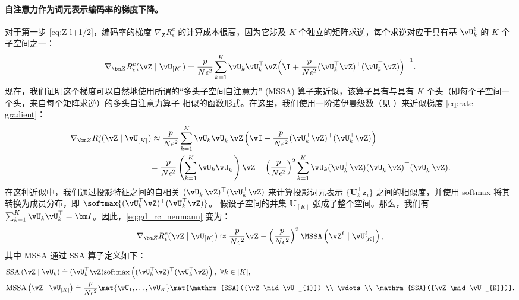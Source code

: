 \documentclass[../../book-main_zh.tex]{subfiles}
\begin{document}
\paragraph{自注意力作为词元表示编码率的梯度下降。} 对于第一步 \eqref{eq:Z l+1/2}，编码率的梯度 \(\nabla_{\bm Z} R^c_\epsilon\) 的计算成本很高，因为它涉及 \(K\) 个独立的矩阵求逆，每个求逆对应于具有基 \(\vU_{k}^{\ell}\) 的 \(K\) 个子空间之一：
\begin{equation}
    \nabla_{\bm Z} R_{\epsilon}^c(\vZ \mid \vU_{[K]})
    = \frac{p}{N\epsilon^2}\sum_{k=1}^K \vU_k\vU_k^\top\vZ\Big(\I +
    \frac{p}{N\epsilon^2}(\vU_k^\top\vZ)^\top(\vU_k^\top\vZ)\Big)^{-1}.
    \label{eq:rate-gradient}
\end{equation}
现在，我们证明这个梯度可以自然地使用所谓的“多头子空间自注意力” (MSSA) 算子来近似，该算子具有与具有 \(K\) 个头（即每个子空间一个头，来自每个矩阵求逆）的多头自注意力算子 \citep{vaswani2017attention} 相似的函数形式。在这里，我们使用一阶诺伊曼级数（见 ）来近似梯度 \eqref{eq:rate-gradient}：
\begin{align}\label{eq:gd_rc_neumann}
    \nabla_{\bm Z} R_{\epsilon}^{c}(\vZ \mid \vU_{[K]})
    &\approx \frac{p}{N\epsilon^2} \sum_{k =
    1}^{K}\vU_{k}\vU_{k}^\top\vZ\left(\vI - \frac{p}{N\epsilon^2}
    (\vU_{k}^\top\vZ)^\top(\vU_{k}^\top\vZ)\right) \notag \\
    &{= \frac{p}{N\epsilon^2} \left(\sum_{k = 1}^{K}
        \vU_{k}\vU_{k}^\top\right)\vZ -  \left(
        \frac{p}{N\epsilon^2}\right)^2\sum_{k = 1}^{K}
    \vU_{k}(\vU_{k}^\top\vZ)(\vU_{k}^\top\vZ)^\top(\vU_{k}^\top\vZ)}.
\end{align}
在这种近似中，我们通过投影特征之间的自相关 $(\vU_{k}^\top\vZ)^\top(\vU_{k}^\top\vZ)$ 来计算投影词元表示 $\{\bm U_k^\top\bm z_i\}$ 之间的相似度，并使用 softmax 将其转换为成员分布，即 $\softmax{(\vU_{k}^\top\vZ)^\top(\vU_{k}^\top\vZ)}$。
假设子空间的并集 $\bm U_{[K]}$ 张成了整个空间。那么，我们有 $\sum_{k = 1}^{K} \vU_{k}\vU_{k}^\top = \bm I$。因此，\eqref{eq:gd_rc_neumann} 变为：
\begin{align}\label{eq:grad Rc}
    \nabla_{\bm Z} R_{\epsilon}^{c}(\vZ \mid \vU_{[K]})
    \approx  \frac{p}{N\epsilon^2} \vZ -  \left(
    \frac{p}{N\epsilon^2}\right)^2 \MSSA\left(\vZ^{\ell} \mid
    \vU_{[K]}^{\ell}\right),
\end{align}
其中 MSSA 通过 SSA 算子定义如下：
\begin{align}
    & \mathrm{SSA}\left(\vZ \mid \vU_{k}\right)
    \doteq (\vU_{k}^\top
    \vZ)\mathrm{softmax}\left((\vU_{k}^\top\vZ)^\top(\vU_{k}^\top\vZ)\right),
    \ \forall k \in [K], \label{eq:SSA} \\
    & \mathrm{MSSA}\left(\vZ \mid \vU_{[K]}\right)
    \doteq \frac{p}{N\epsilon^2} \mat{\vU_{1}, \dots,
    \vU_{K}}\mat{\mathrm{SSA}({\vZ \mid \vU_{1}}) \\ \vdots
    \\ \mathrm{SSA}({\vZ \mid \vU_{K}})}.\label{eq:Multi-Head-SSA}
\end{align}
\end{document}

